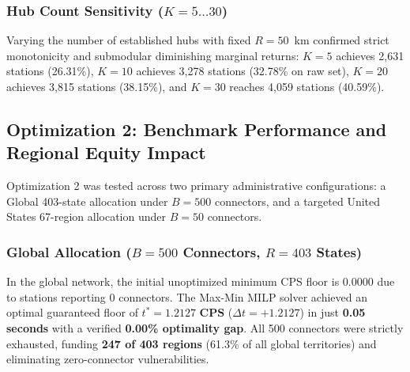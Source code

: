 \documentclass[conference]{IEEEtran}
\begin{document}
\begin{table}[H]
\caption{Coverage Radius Sensitivity Curve ($K=10, M=100$)}
\label{tab:radius_sensitivity}
\centering
{}
\end{table}

\subsubsection{Hub Count Sensitivity ($K = 5 \dots 30$)}
Varying the number of established hubs with fixed $R = 50$~km confirmed strict monotonicity and submodular diminishing marginal returns: $K = 5$ achieves 2,631 stations (26.31\%), $K = 10$ achieves 3,278 stations (32.78\% on raw set), $K = 20$ achieves 3,815 stations (38.15\%), and $K = 30$ reaches 4,059 stations (40.59\%).

\subsection{Optimization 2: Benchmark Performance and Regional Equity Impact}
Optimization 2 was tested across two primary administrative configurations: a Global 403-state allocation under $B = 500$ connectors, and a targeted United States 67-region allocation under $B = 50$ connectors.

\subsubsection{Global Allocation ($B = 500$ Connectors, $R = 403$ States)}
In the global network, the initial unoptimized minimum CPS floor is $0.0000$ due to stations reporting 0 connectors. The Max-Min MILP solver achieved an optimal guaranteed floor of $t^* = \mathbf{1.2127\text{ CPS}}$ ($\Delta t = +1.2127$) in just \textbf{0.05 seconds} with a verified \textbf{0.00\% optimality gap}. All 500 connectors were strictly exhausted, funding \textbf{247 of 403 regions} (61.3\% of all global territories) and eliminating zero-connector vulnerabilities.
\end{document}
